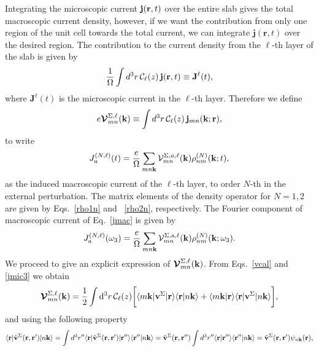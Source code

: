\documentclass[floatfix,prb,aps,superscriptaddress,11pt,preprint]{revtex4}
\begin{document}
Integrating the microscopic current $\mathbf{j}(\mathbf{r},t)$ over
the entire slab gives the total macroscopic current density, 
 however, if we want the
contribution from only one region of the unit cell towards the total
current, we can integrate $\mathbf{j}({\mathbf r},t)$ over the
desired region. The contribution to the current density from the
$\ell$-th layer of the slab is given by
\begin{equation}\label{jsz}
\frac{1}{\Omega}\int d^3r\, {\mathbf{\cal C}}_\ell(z)\, \mathbf{j}(\mathbf{r},t)
 \equiv \mathbf{J}^{\ell}(t),
\end{equation}
where $\mathbf{J}^{\ell}(t)$ is the microscopic current  in the
$\ell$-th layer.
Therefore we define
\begin{equation}\label{vcal}
e{\boldsymbol{\mathcal{V}}}^{\Sigma,\ell}_{mn}(\mathbf{k})
\equiv
\int d^3r\, {\mathbf{\cal C}}_\ell(z)\,\mathbf{j}_{mn}({\mathbf{k}};\mathbf{r}),
\end{equation}
to write
\begin{equation}\label{jmac}
J_a^{(N,\ell)}(t)=\frac{e}{\Omega}
\sum_{mn\mathbf{k}}
\mathcal{V}^{\Sigma,a,\ell}_{mn}(\mathbf{k})
\rho^{(N)}_{nm}(\mathbf{k};t),
\end{equation}
as the induced macroscopic current of the  $\ell$-th layer,
 to order $N$-th in the external
perturbation.
 The matrix elements of the
density operator for $N=1,2$ are given by Eqs.~\eqref{rho1n} and
~\eqref{rho2n}, respectively. 
The Fourier component of macroscopic current of Eq.~\eqref{jmac} is given by
\begin{equation}\label{jmac2}
J_{\mathrm{a}}^{(N,\ell)}(\omega_3)=\frac{e}{\Omega}
\sum_{mn\mathbf{k}}
{\mathbf{\cal V}}^{\Sigma,\mathrm{a},\ell}_{mn}(\mathbf{k})
\rho^{(N)}_{nm}(\mathbf{k};\omega_3)
.
\end{equation}
We proceed to give an explicit expression of
$\boldsymbol{\mathcal{\cal V}}^{\Sigma,\ell}_{mn}(\mathbf{k})$.
From
Eqs.~\eqref{vcal} and \eqref{jmic3} we obtain
\begin{equation}\label{intj}
{\boldsymbol{\mathcal{V}}}^{\Sigma,\ell}_{mn}({\mathbf k})=
\frac{1}{2}
\int \mathrm{d}^3 r\,
 {\mathbf{\cal C}}_\ell(z)
\bigg[
\langle m\mathbf{k}|\mathbf{v}^\Sigma | \mathbf{r}\rangle
\langle \mathbf{r} | n \mathbf k \rangle +
\langle m\mathbf{k} | \mathbf{r}\rangle
\langle \mathbf{r} | \mathbf{v}^\Sigma | n \mathbf k \rangle\bigg]
,
\end{equation}  
and using the following property
\begin{equation}\label{nl.2}
\langle \mathbf{r} | \hat{\mathbf{v}}^\Sigma(\mathbf{r},\mathbf{r}')| n\mathbf{k} \rangle
=\int d^3 r'' \langle \mathbf{r} |\hat{\mathbf{v}}^\Sigma(\mathbf{r},\mathbf{r}')| \mathbf{r}'' \rangle
\langle {\mathbf{r}''} | {n\mathbf{k}} \rangle
=\hat{\mathbf{v}}^\Sigma(\mathbf{r},\mathbf{r}'')
\int d^3 r'' \langle {\mathbf{r}} | {\mathbf{r}''} \rangle
\langle {\mathbf{r}''} | {n\mathbf{k}} \rangle
=\hat{\mathbf{v}}^\Sigma(\mathbf{r},\mathbf{r}')
\psi_{n\mathbf{k}}(\mathbf{r})
,
\end{equation}
\end{document}
